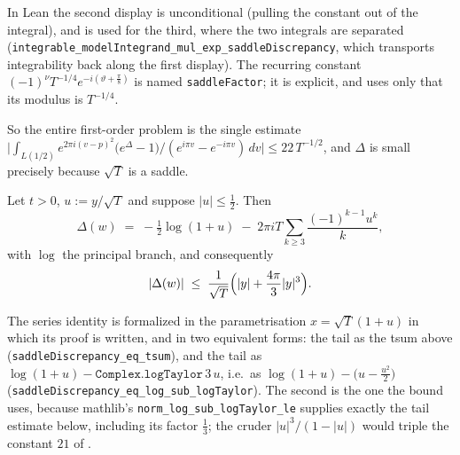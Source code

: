 In Lean the second display is unconditional (pulling the constant out of the integral), and
 is used for the third, where the two
integrals are separated (\texttt{integrable\_modelIntegrand\_mul\_exp\_saddleDiscrepancy}, which
transports integrability back along the first display).  The recurring constant
$(-1)^{\nu}T^{-1/4}e^{-i\left(\vartheta+\frac\pi8\right)}$ is named
\texttt{saddleFactor}; it is explicit, and  uses only that its modulus is
$T^{-1/4}$.

So the entire first-order problem is the single estimate
$\bigl\lvert\int_{L(1/2)}e^{2\pi i(v-p)^{2}}\bigl(e^{\Delta}-1\bigr)\bigl/(e^{i\pi v}-e^{-i\pi v})\,dv\bigr\rvert
 \le 22\,T^{-1/2}$, and $\Delta$ is small precisely because $\sqrt T$ is a saddle.

\begin{lemma}
\label{lem:rsf_discrepancy_bound}
\leanok
{}
Let $t>0$, $u:=y/\sqrt T$ and suppose $\lvert u\rvert\le\tfrac12$.  Then
\[
  \Delta(w)\;=\;-\tfrac12\log(1+u)\;-\;2\pi iT\sum_{k\ge3}\frac{(-1)^{k-1}u^{k}}{k},
\]
with $\log$ the principal branch, and consequently
\[
  \lvert\Delta(w)\rvert\;\le\;\frac{1}{\sqrt T}\Bigl(\lvert y\rvert+\frac{4\pi}{3}\lvert y\rvert^{3}\Bigr).
\]
\end{lemma}

The series identity is formalized in the parametrisation $x=\sqrt T(1+u)$ in which its proof is
written, and in two equivalent forms: the tail as the tsum above
(\texttt{saddleDiscrepancy\_eq\_tsum}), and the tail as
$\log(1+u)-\texttt{Complex.logTaylor}\,3\,u$, i.e.\ as
$\log(1+u)-\bigl(u-\tfrac{u^{2}}2\bigr)$ (\texttt{saddleDiscrepancy\_eq\_log\_sub\_logTaylor}).  The
second is the one the bound uses, because mathlib's \texttt{norm\_log\_sub\_logTaylor\_le} supplies
exactly the tail estimate below, including its factor $\tfrac13$; the cruder
$\lvert u\rvert^{3}/(1-\lvert u\rvert)$ would triple the constant $21$ of .

